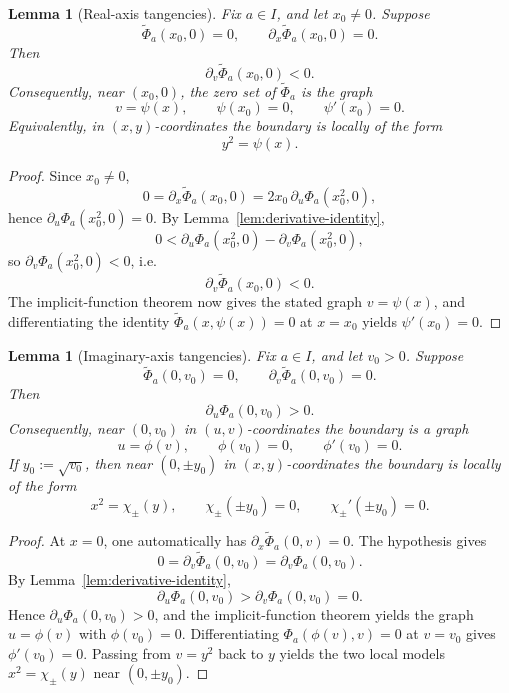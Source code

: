 \documentclass[11pt]{article}
\newtheorem{lemma}[theorem]{Lemma}
\begin{document}
\begin{lemma}[Real-axis tangencies]\label{lem:real-axis-tangency}
Fix \(a\in I\), and let \(x_0\neq 0\). Suppose
\[
\widetilde\Phi_a(x_0,0)=0,
\qquad
\partial_x\widetilde\Phi_a(x_0,0)=0.
\]
Then
\[
\partial_v\widetilde\Phi_a(x_0,0)<0.
\]
Consequently, near \((x_0,0)\), the zero set of \(\widetilde\Phi_a\) is the graph
\[
v=\psi(x),
\qquad
\psi(x_0)=0,
\qquad
\psi'(x_0)=0.
\]
Equivalently, in \((x,y)\)-coordinates the boundary is locally of the form
\[
y^2=\psi(x).
\]
\end{lemma}

\begin{proof}
Since \(x_0\neq 0\),
\[
0=\partial_x\widetilde\Phi_a(x_0,0)=2x_0\,\partial_u\Phi_a(x_0^2,0),
\]
hence \(\partial_u\Phi_a(x_0^2,0)=0\). By Lemma~\ref{lem:derivative-identity},
\[
0<\partial_u\Phi_a(x_0^2,0)-\partial_v\Phi_a(x_0^2,0),
\]
so \(\partial_v\Phi_a(x_0^2,0)<0\), i.e.
\[
\partial_v\widetilde\Phi_a(x_0,0)<0.
\]
The implicit-function theorem now gives the stated graph \(v=\psi(x)\), and differentiating the identity \(\widetilde\Phi_a(x,\psi(x))=0\) at \(x=x_0\) yields \(\psi'(x_0)=0\).
\end{proof}

\begin{lemma}[Imaginary-axis tangencies]\label{lem:imag-axis-tangency}
Fix \(a\in I\), and let \(v_0>0\). Suppose
\[
\widetilde\Phi_a(0,v_0)=0,
\qquad
\partial_v\widetilde\Phi_a(0,v_0)=0.
\]
Then
\[
\partial_u\Phi_a(0,v_0)>0.
\]
Consequently, near \((0,v_0)\) in \((u,v)\)-coordinates the boundary is a graph
\[
u=\phi(v),
\qquad
\phi(v_0)=0,
\qquad
\phi'(v_0)=0.
\]
If \(y_0:=\sqrt{v_0}\), then near \((0,\pm y_0)\) in \((x,y)\)-coordinates the boundary is locally of the form
\[
x^2=\chi_\pm(y),
\qquad
\chi_\pm(\pm y_0)=0,
\qquad
\chi_\pm'(\pm y_0)=0.
\]
\end{lemma}

\begin{proof}
At \(x=0\), one automatically has \(\partial_x\widetilde\Phi_a(0,v)=0\). The hypothesis gives
\[
0=\partial_v\widetilde\Phi_a(0,v_0)=\partial_v\Phi_a(0,v_0).
\]
By Lemma~\ref{lem:derivative-identity},
\[
\partial_u\Phi_a(0,v_0)>\partial_v\Phi_a(0,v_0)=0.
\]
Hence \(\partial_u\Phi_a(0,v_0)>0\), and the implicit-function theorem yields the graph \(u=\phi(v)\) with \(\phi(v_0)=0\). Differentiating \(\Phi_a(\phi(v),v)=0\) at \(v=v_0\) gives \(\phi'(v_0)=0\). Passing from \(v=y^2\) back to \(y\) yields the two local models \(x^2=\chi_\pm(y)\) near \((0,\pm y_0)\).
\end{proof}
\end{document}
